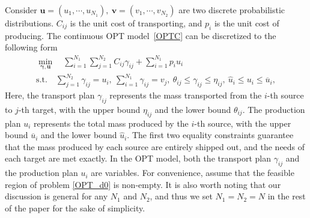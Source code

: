 \documentclass[review,hidelinks,onefignum,onetabnum]{siamart220329}
\begin{document}
Consider $\bm{u} = \left(u_1, \cdots,  u_{N_1}\right), \ \bm{v}=\left( v_1, \cdots, v_{N_2}\right)$
are two discrete probabilistic distributions. $C_{ij}$ is the unit cost of transporting, 
and $p_{i}$ is the unit cost of producing. 
The continuous OPT model~\eqref{OPTC} can be discretized to the following form
\begin{equation}
\label{OPT_d0}
    \begin{gathered}
        \min_{\bm{\gamma}, \bm{u}} \quad \sum_{i=1}^{N_1}\sum_{j=1}^{N_2} C_{ij}\gamma_{ij}+\sum_{i=1}^{N_1}p_i u_i\\
        \mathrm{s.t.} \quad \sum_{j=1}^{N_2} \gamma_{ij} = u_i,  \ \sum_{i=1}^{N_1} \gamma_{ij} = v_j, \ 
        \theta_{ij} \leq \gamma_{ij}\leq \eta_{ij}, \  \hat{u}_i\leq u_i \leq \overline{u}_i, 
    \end{gathered}
\end{equation}
Here, the transport plan $\gamma_{ij}$ represents the mass transported from the $i$-th source to $j$-th target, with the upper bound $\eta_{ij}$ and the lower bound $\theta_{ij}$. 
The production plan $u_{i}$ represents the total mass produced by the $i$-th source, with the upper bound $\overline{u}_i$ and the lower bound $\hat{u}_{i}$. 
The first two equality constraints guarantee that the mass produced by each source are entirely shipped out, and the needs of each target are met exactly. 
In the OPT model, both the transport plan $\gamma_{ij}$ and the production plan $u_i$ are variables.
For convenience, assume that the feasible region of problem \cref{OPT_d0} is non-empty.
It is also worth noting that our discussion is general for any $N_1$ and $N_2$, and thus we set $N_1 = N_2 = N$ in the rest of the paper for the sake of simplicity.
\end{document}
